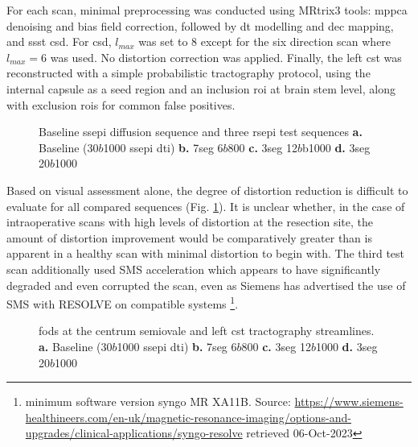 For each scan, minimal preprocessing was conducted using MRtrix3\autocite{Tournier2019} tools:
\Gls{mppca} denoising and bias field correction, followed by \gls{dt} modelling and \gls{dec} mapping, and \gls{ssst} \gls{csd}.
For \gls{csd}, $l_{max}$ was set to 8 except for the six direction scan where $l_{max}=6$ was used.
No distortion correction was applied.
Finally, the left \gls{cst} was reconstructed with a simple probabilistic tractography protocol, using the internal capsule as a seed region and an inclusion \gls{roi} at brain stem level, along with exclusion \glspl{roi} for common false positives.

\begin{figure}[h!]
  \centering
  
  \caption[RS-EPI test scan results]{Baseline \gls{ssepi} diffusion sequence and three \gls{rsepi} test sequences
    \textbf{\sffamily a.} Baseline (30\x{}$b$1000 \gls{ssepi} \gls{dti})
    \textbf{\sffamily b.} 7seg 6\x{}$b$800
    \textbf{\sffamily c.} 3seg 12\x{}$b$b1000
    \textbf{\sffamily d.} 3seg 20\x{}$b$1000}\label{fig:rsepi}
\end{figure}

Based on visual assessment alone, the degree of distortion reduction is difficult to evaluate for all compared sequences (Fig. \ref{fig:rsepi}).
It is unclear whether, in the case of intraoperative scans with high levels of distortion at the resection site, the amount of distortion improvement would be comparatively greater than is apparent in a healthy scan with minimal distortion to begin with.
The third test scan additionally used SMS acceleration which appears to have significantly degraded and even corrupted the scan, even as Siemens has advertised the use of SMS with RESOLVE on compatible systems
\footnote[2]{minimum software version syngo MR XA11B. Source: \url{https://www.siemens-healthineers.com/en-uk/magnetic-resonance-imaging/options-and-upgrades/clinical-applications/syngo-resolve} retrieved 06-Oct-2023}.


\begin{figure}[h!]
  \centering
  
  \caption[RS-EPI test scan fibre orientation and CST reconstructions]{\Glspl{fod} at the centrum semiovale and left \gls{cst} tractography streamlines.
  \textbf{\sffamily a.} Baseline (30\x{}$b$1000 \gls{ssepi} \gls{dti})
  \textbf{\sffamily b.} 7seg 6\x{}$b$800
  \textbf{\sffamily c.} 3seg 12\x{}$b$1000
  \textbf{\sffamily d.} 3seg 20\x{}$b$1000}
  \label{fig:rsepi-fod}
\end{figure}

